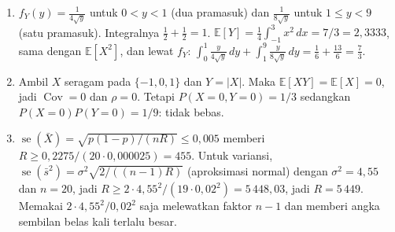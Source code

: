 \begin{enumerate}[label=\textbf{18.\arabic*}]
  \item $f_{Y}(y)=\frac{1}{4\sqrt{y}}$ untuk $0<y<1$ (dua pramasuk) dan
        $\frac{1}{8\sqrt{y}}$ untuk $1\le y<9$ (satu pramasuk). Integralnya
        $\tfrac12+\tfrac12=1$. $\mathbb{E}[Y]=\frac14\int_{-1}^{3}x^{2}\,dx=7/3
        =2{,}3333$, sama dengan $\mathbb{E}[X^{2}]$, dan lewat $f_{Y}$:
        $\int_{0}^{1}\frac{y}{4\sqrt{y}}\,dy+\int_{1}^{9}\frac{y}{8\sqrt{y}}\,dy
        =\tfrac16+\tfrac{13}6=\tfrac73$.

  \item Ambil $X$ seragam pada $\{-1,0,1\}$ dan $Y=|X|$. Maka
        $\mathbb{E}[XY]=\mathbb{E}[X]=0$, jadi $\operatorname{Cov}=0$ dan $\rho=0$.
        Tetapi $P(X=0,Y=0)=1/3$ sedangkan $P(X=0)P(Y=0)=1/9$: tidak bebas.

  \item 
$\operatorname{se}(\bar X)=\sqrt{p(1-p)/(nR)}\le0{,}005$ memberi
        $R\ge0{,}2275/(20\cdot0{,}000025)=455$. Untuk variansi,
        $\operatorname{se}(\bar s^{2})=\sigma^{2}\sqrt{2/((n-1)R)}$ (aproksimasi
        normal) dengan $\sigma^{2}=4{,}55$ dan $n=20$, jadi
        $R\ge2\cdot4{,}55^{2}/(19\cdot0{,}02^{2})=5\,448{,}03$, jadi $R=5\,449$.
        Memakai $2\cdot4{,}55^{2}/0{,}02^{2}$ saja melewatkan faktor $n-1$ dan
        memberi angka sembilan belas kali terlalu besar.
  \end{enumerate}

